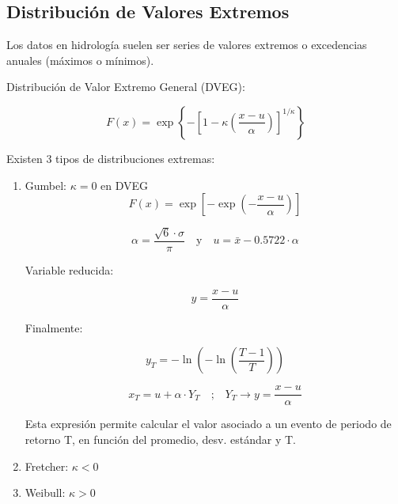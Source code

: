 \subsection{Distribución de Valores Extremos}

Los datos en hidrología suelen ser series de valores extremos o excedencias anuales (máximos o mínimos).

Distribución de Valor Extremo General (DVEG):

\begin{equation}
    F(x) = \exp \left\{ - \left[ 1 - \kappa \left( \frac{x - u}{\alpha} \right) \right]^{1/\kappa} \right\}
\end{equation}

Existen 3 tipos de distribuciones extremas:

\begin{enumerate}
    \item Gumbel: $\kappa = 0$ en DVEG
    \begin{equation}
        F(x) = \exp\left[-\exp\left(-\frac{x-u}{\alpha}\right)\right]
    \end{equation}
        
    \begin{equation}
        \alpha = \frac{\sqrt{6} \cdot \sigma}{\pi}
        \quad \text{y} \quad
        u = \bar{x} - 0.5722 \cdot \alpha
    \end{equation}

    Variable reducida:

    \begin{equation}
        y = \frac{x-u}{\alpha}
    \end{equation}

    Finalmente:

    \begin{equation}
        y_T = -\ln(-\ln\left(\frac{T-1}{T}\right))
    \end{equation}

    \begin{equation}
        x_T = u + \alpha \cdot Y_T
        \quad \text{;} \quad
        Y_T \rightarrow y = \frac{x-u}{\alpha} 
    \end{equation}

    Esta expresión permite calcular el valor asociado a un evento de periodo de retorno T, en función del promedio, desv. estándar y T.

    \item Fretcher: $\kappa < 0$
    \item Weibull: $\kappa > 0$
\end{enumerate}






